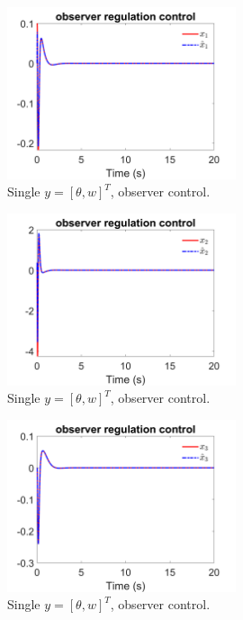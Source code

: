 \documentclass[12pt]{article}
\numberwithin{equation}{section}
\begin{document}
\begin{figure}[!ht]
    \centering
    \includegraphics[width=0.6\textwidth]{double_output_observer/fig5.png}
    \caption{Single $y = [\theta,w]^T$, observer control.}
\end{figure}

\begin{figure}[!ht]
    \centering
    \includegraphics[width=0.6\textwidth]{double_output_observer/fig6.png}
    \caption{Single $y = [\theta,w]^T$, observer control.}
\end{figure}

\begin{figure}[!ht]
    \centering
    \includegraphics[width=0.6\textwidth]{double_output_observer/fig7.png}
    \caption{Single $y = [\theta,w]^T$, observer control.}
\end{figure}
\end{document}
